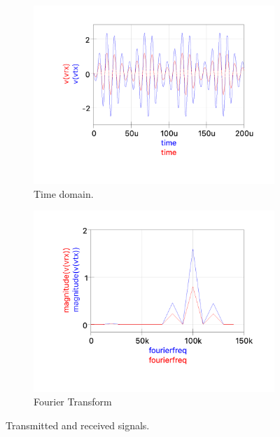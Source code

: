 \begin{figure}[H]
    \centering
    \begin{subfigure}[t]{0.5\textwidth}
        \centering
        \includegraphics[width=\textwidth]{Images/Qucs_vtx:vrx.png}
        \caption{Time domain.}
        \label{fig:Qucs_vtx/vrx_time}
    \end{subfigure}%
    \begin{subfigure}[t]{0.5\textwidth}
        \centering
        \includegraphics[width=\textwidth]{Images/Qucs_vtx:vrx_fft.png}
        \caption{Fourier Transform}
        \label{fig:Qucs_vtx/vrx_fft}
    \end{subfigure}
    \caption{Transmitted and received signals.}
    \label{fig:Qucs_vtx/vrx}
\end{figure}

